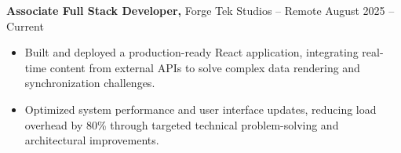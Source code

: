 \documentclass[11pt]{article}       %
\begin{document}
\textbf{Associate Full Stack Developer,} {Forge Tek Studios} -- Remote \hfill August 2025 -- Current 
\vspace{-9pt}
\begin{itemize}
  \item Built and deployed a production-ready React application, integrating real-time content from external APIs to solve complex data rendering and synchronization challenges.
  \item Optimized system performance and user interface updates, reducing load overhead by 80\% through targeted technical problem-solving and architectural improvements.
\end{itemize}

\end{document}
